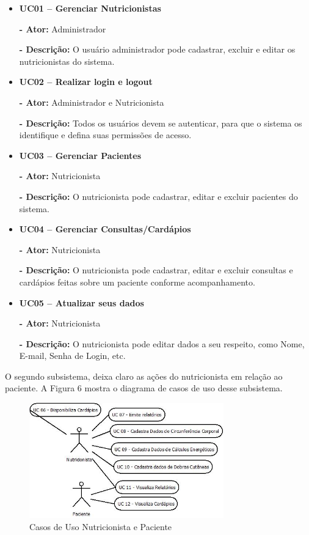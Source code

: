\documentclass[
	12pt,				%
    oneside,			%
	a4paper,			%
	english,			%
	french,				%
	spanish,			%
	brazil,				%
	]{abntex2}
\begin{document}
\begin{itemize}
\item \textbf{UC01 – Gerenciar Nutricionistas}

\textbf{- Ator:} Administrador

\textbf{- Descrição:} O usuário administrador pode cadastrar, excluir e
editar os nutricionistas do sistema.

\item \textbf{UC02 – Realizar login e logout}

\textbf{- Ator:} Administrador e Nutricionista

\textbf{- Descrição:} Todos os usuários devem se autenticar, para que o
sistema os identifique e defina suas permissões de acesso.

\item \textbf{UC03 – Gerenciar Pacientes}

\textbf{- Ator:} Nutricionista

\textbf{- Descrição:} O nutricionista pode cadastrar, editar e excluir
pacientes do sistema.

\item \textbf{UC04 – Gerenciar Consultas/Cardápios}

\textbf{- Ator:} Nutricionista

\textbf{- Descrição:} O nutricionista pode cadastrar, editar e excluir
consultas e cardápios feitas sobre um paciente conforme acompanhamento.

\item \textbf{UC05 – Atualizar seus dados}

\textbf{- Ator:} Nutricionista

\textbf{- Descrição:} O nutricionista pode editar dados a seu respeito,
como Nome, E-mail, Senha de Login, etc.

\end{itemize}

O segundo subsistema, deixa claro as ações do nutricionista em relação ao
paciente. A Figura 6 mostra o diagrama de casos de uso desse subsistema.

\begin{figure} [hbt] 
\begin{center}
\includegraphics[width=0.75\textwidth]{uc2.jpeg}
\end{center}
\label{table1} 
\caption{Casos de Uso Nutricionista e Paciente}
\end{figure}
\end{document}

